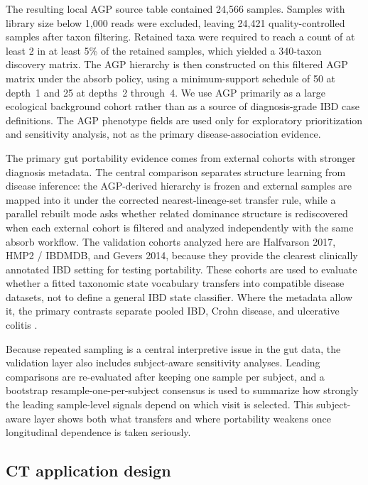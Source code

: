 \documentclass[11pt]{article}
\begin{document}
The resulting local AGP source table contained 24,566 samples. Samples with
library size below 1,000 reads were excluded, leaving 24,421
quality-controlled samples after taxon filtering. Retained taxa were required
to reach a count of at least 2 in at least 5\% of the retained samples, which
yielded a 340-taxon discovery matrix. The AGP hierarchy is then
constructed on this filtered AGP matrix under the absorb policy, using a
minimum-support schedule of 50 at depth~1 and 25 at depths~2 through~4. We use
AGP primarily as a large ecological background cohort rather than as a source
of diagnosis-grade IBD case definitions. The AGP phenotype fields are used only
for exploratory prioritization and sensitivity analysis, not as the
primary disease-association evidence.

The primary gut portability evidence comes from external cohorts with stronger diagnosis
metadata. The central comparison separates structure learning from disease
inference: the AGP-derived hierarchy is frozen and external samples are mapped
into it under the corrected nearest-lineage-set transfer rule, while a parallel
rebuilt mode asks whether related dominance structure is rediscovered when each
external cohort is filtered and analyzed independently with the same absorb
workflow. The validation cohorts analyzed here are
Halfvarson 2017, HMP2 / IBDMDB, and Gevers 2014, because they provide the
clearest clinically annotated IBD setting for testing portability. These cohorts
are used to evaluate whether a fitted taxonomic state vocabulary transfers into
compatible disease datasets, not to define a general IBD state classifier. Where
the metadata allow it, the primary contrasts separate pooled IBD, Crohn disease,
and ulcerative colitis \cite{Halfvarson2017_IBD,LloydPrice2019_IBD,Gevers2014_CD}.

Because repeated sampling is a central interpretive issue in the gut data, the
validation layer also includes subject-aware sensitivity analyses. Leading
comparisons are re-evaluated after keeping one sample per subject, and a
bootstrap resample-one-per-subject consensus is used to summarize how strongly
the leading sample-level signals depend on which visit is selected. This
subject-aware layer shows both what transfers and where portability weakens once
longitudinal dependence is taken seriously.

\subsection{CT application design}
\end{document}
